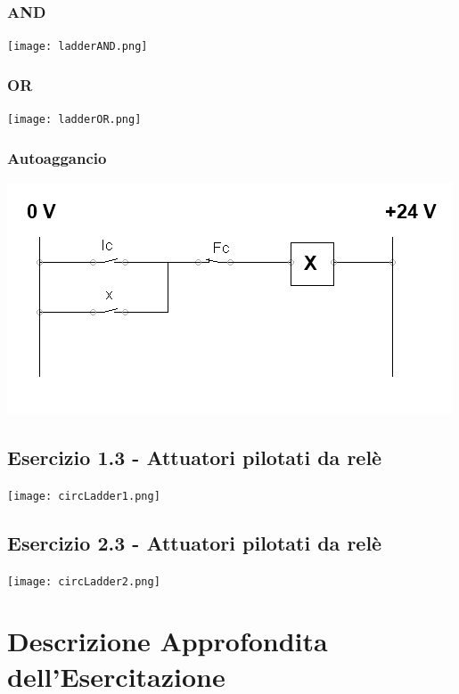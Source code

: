 \documentclass[a4paper]{article}
\begin{document}
\subsubsection{AND}
\begin{center}
\texttt{[image: ladderAND.png]}
\end{center}

\subsubsection{OR}
\begin{center}
\texttt{[image: ladderOR.png]}
\end{center}

\subsubsection{Autoaggancio}
\begin{center}
\includegraphics[scale=0.6]{Autoaggancio.png}
\end{center}


\subsection{Esercizio 1.3 - Attuatori pilotati da relè}
\begin{center}
\texttt{[image: circLadder1.png]}
\end{center}

\subsection{Esercizio 2.3 - Attuatori pilotati da relè}
\begin{center}
\texttt{[image: circLadder2.png]}
\end{center}

\section{Descrizione Approfondita dell'Esercitazione}
\end{document}
